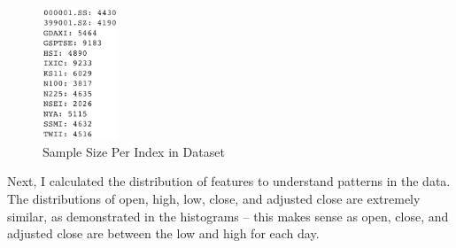 \documentclass[a4paper, 11pt]{article}
\begin{document}
\begin{figure}
    \begin{center}
        \includegraphics[width=0.2\textwidth]{Sample Size Per Index.png}
        \caption{Sample Size Per Index in Dataset}
    \end{center}
\end{figure}

Next, I calculated the distribution of features to understand patterns in the data. The distributions of open, high, low, close, and adjusted close are extremely similar, as demonstrated in the histograms -- this makes sense as open, close, and adjusted close are between the low and high for each day.
\end{document}
